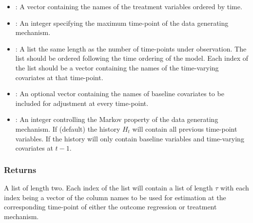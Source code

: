 \documentclass[]{jss}
\begin{document}
\begin{itemize}

  \item {}: A vector containing the names of the treatment variables ordered by time.
  \item {}: An integer specifying the maximum time-point of the data generating mechanism.
  \item {}: A list the same length as the number of time-points under observation.
  The list should be ordered following the time ordering of the model.
  Each index of the list should be a vector containing the names of the time-varying covariates
  at that time-point. 
  \item {}: An optional vector containing the names of baseline covariates
  to be included for adjustment at every time-point.
  \item {}: An integer controlling the Markov property of the data generating mechanism. If 
  (default) the history \(H_t\) will contain all previous time-point variables. If  the history will
  only contain baseline variables and time-varying covariates at \(t - 1\).
  
\end{itemize}

\subsubsection{Returns}

A list of length two. Each index of the list will contain a list of length \(\tau\) with
each index being a vector of the column names to be used for estimation at the corresponding
time-point of either the outcome regression or treatment mechanism.

\renewcommand\refname{References}

\end{document}
